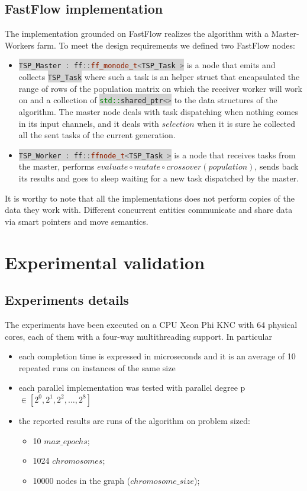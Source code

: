 \documentclass[11pt]{article}
\newcommand{\inlinecode}[2]{\colorbox{lightgray}{\lstinline[language=#1]$#2$}}
\begin{document}
\subsection{FastFlow implementation}
The implementation grounded on FastFlow realizes the algorithm with a Master-Workers farm. To meet the design requirements we defined two FastFlow nodes:
\begin{itemize}
	\item \inlinecode{C++}{TSP_Master : ff::ff_monode_t<TSP_Task >} is a node that emits and collects \inlinecode{C++}{TSP_Task} where such a task is an helper struct that encapsulated the range of rows of the population matrix on which the receiver worker will work on and a collection of \inlinecode{C++}{std::shared_ptr<>} to the data structures of the algorithm. The master node deals with task dispatching when nothing comes in its input channels, and it deals with $ selection $ when it is sure he collected all the sent tasks of the current generation.
	\item \inlinecode{C++}{TSP_Worker : ff::ffnode_t<TSP_Task >} is a node that receives tasks from the master, performs $evaluate \circ mutate \circ crossover (population)$, sends back its results and goes to sleep waiting for a new task dispatched by the master.
\end{itemize} 
It is worthy to note that all the implementations does not perform copies of the data they work with. Different concurrent entities communicate and share data via smart pointers and move semantics.

\section{Experimental validation}
\subsection{Experiments details}
The experiments have been executed on a CPU Xeon Phi KNC with 64 physical cores, each of them with a four-way multithreading support. In particular
\begin{itemize}
	\item each completion time is expressed in microseconds and it is an average of 10 repeated runs on instances of the same size
	\item each parallel implementation was tested with parallel degree p $ \in [2^{0}, 2^{1}, 2^{2}, \dots , 2^{8}] $
	\item the reported results are runs of the algorithm on problem sized:
	\begin{itemize}
		\item 10 $ max\_epochs $;
		\item 1024 $chromosomes$;
		\item 10000 nodes in the graph ($chromosome\_size$);
	\end{itemize}
\end{itemize}
\end{document}
